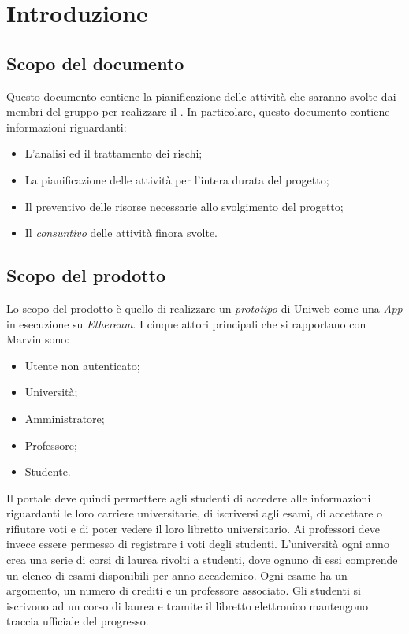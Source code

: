 \newpage
\section{Introduzione}
\subsection{Scopo del documento}
Questo documento contiene la pianificazione delle attività che saranno svolte dai membri del gruppo \Gruppo{} per realizzare il \NomeProgetto. In particolare, questo documento contiene informazioni riguardanti:

\begin{itemize}
	\item L'analisi ed il trattamento dei rischi;
	\item La pianificazione delle attività per l'intera durata del progetto;
	\item Il preventivo delle risorse necessarie allo svolgimento del progetto;
	\item Il \emph{consuntivo} delle attività finora svolte.
\end{itemize}

\subsection{Scopo del prodotto}
Lo scopo del prodotto è quello di realizzare un \emph{prototipo} di Uniweb come una \emph{\DJ App} in esecuzione su \emph{Ethereum}. I cinque attori principali che si rapportano con Marvin sono:
\begin{itemize}
	\item Utente non autenticato; 
	\item Università;
	\item Amministratore;
	\item Professore;
	\item Studente.
\end{itemize} 
Il portale deve quindi permettere agli studenti di accedere alle informazioni riguardanti le loro carriere universitarie, di iscriversi agli esami, di accettare o rifiutare voti e di poter vedere il loro libretto universitario.
Ai professori deve invece essere permesso di registrare i voti degli studenti.
L'università ogni anno crea una serie di corsi di laurea rivolti a studenti, dove ognuno di essi comprende un elenco di esami disponibili per anno accademico. Ogni esame ha un argomento, un numero di crediti e un professore associato. Gli studenti si iscrivono ad un corso di laurea e tramite il libretto elettronico mantengono traccia ufficiale del progresso.

